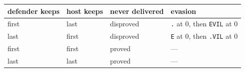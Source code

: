 \begin{tabular}{llll}
\toprule
defender keeps & host keeps & never delivered & evasion \\
\midrule
first & last & disproved & \texttt{.} at 0, then \texttt{EVIL} at 0 \\
last & first & disproved & \texttt{E} at 0, then \texttt{.VIL} at 0 \\
first & first & proved & --- \\
last & last & proved & --- \\
\bottomrule
\end{tabular}
